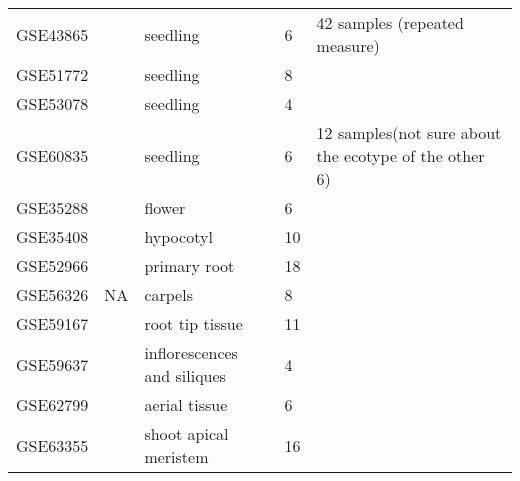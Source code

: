 \documentclass[letterpaper,12pt]{article}
\begin{document}
\begin{table}[!ht]
\begin{tabular}{p{2.5cm}p{2cm}p{4.5cm}p{1cm}p{5cm}}
			GSE43865   & \cite{rugnone2013lnk}                & seedling                                                 & 6           & 42 samples (repeated measure)             \\
			GSE51772   & \cite{oh2014cell}                    & seedling                                                 & 8           &                        \\
			GSE53078   & \cite{fan2014bhlh}                   & seedling                                                 & 4           &                        \\
			GSE60835   & \cite{dong2014arabidopsis}           & seedling                                                 & 6           &12 samples(not sure about the ecotype of the other 6)                 \\  \hline
			GSE35288   & \cite{niederhuth2013transcriptional} & flower                                                   & 6           &                        \\
			GSE35408   & \cite{bai2012brassinosteroid}        & hypocotyl                                                & 10          &                        \\
			GSE52966   & \cite{chaiwanon2015spatiotemporal}   & primary root                                             & 18          &                        \\
			GSE56326   & NA                            & carpels  & 8           &                        \\
			GSE59167   & \cite{pallakies2014cle40}            & root tip tissue                                          & 11          &                        \\
			GSE59637   & \cite{mizzotti2014seedstick}         & inflorescences and siliques                              & 4           &                        \\
			GSE62799   & \cite{groth2014snf2}                 & aerial tissue                                            & 6           &                        \\
			GSE63355   & \cite{liu2015repair}                 & shoot apical meristem                                    & 16          &               \\ \hline        
		\end{tabular}
	\end{table}
	
	
	
\end{document}
